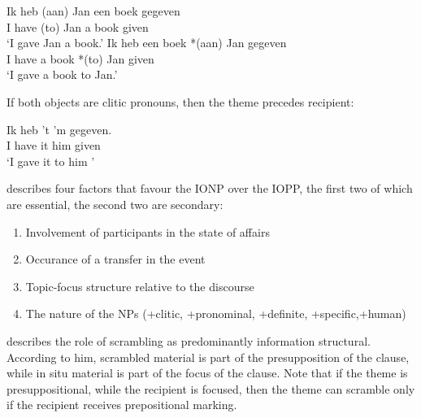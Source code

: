\begin{exe}
\ex 
\begin{xlist}
\ex \gll Ik heb (aan) Jan een boek gegeven\\
I have (to) Jan a book given\\
\trans `I gave Jan a book.' 
\ex \gll Ik heb een boek *(aan) Jan gegeven\\
I have a book *(to) Jan given\\
\trans `I gave a book to Jan.'
\end{xlist}
\end{exe}
If both objects are clitic pronouns, then the theme precedes recipient:
\begin{exe}
\ex \gll Ik heb 't 'm gegeven.\\
I have it him given\\
\trans `I gave it to him \cite[ex 1c]{vanBelle.1996b}'
\end{exe}
\cite{vanBelle.1996b} describes four factors that favour the IONP over the IOPP, the first two of which are essential, the second two are secondary:
\begin{enumerate}
\item Involvement of participants in the state of affairs
\item Occurance of a transfer in the event
\item Topic-focus structure relative to the discourse
\item The nature of the NPs (+clitic, +pronominal, +definite, +specific,+human)
\end{enumerate}
\nocite{Broekhuis.1994}
\cite[1071]{Broekhuis.2012} describes the role of scrambling as predominantly information structural. According to him, scrambled material is part of the presupposition of the clause, while in situ material is part of the focus of the clause. Note that if the theme is presuppositional, while the recipient is focused, then the theme can scramble only if the recipient receives prepositional marking.
